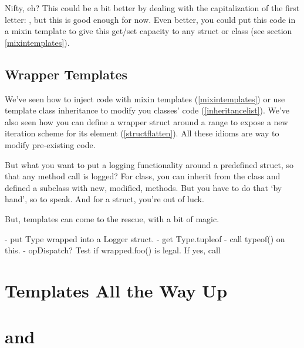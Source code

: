 Nifty, eh? This could be a bit better by dealing with the capitalization of the first letter: , but this is good enough for now. Even better, you could put this code in a mixin template to give this get/set capacity to any struct or class (see section \ref{mixintemplates}).

\subsection{Wrapper Templates}\label{wrappertemplates}


We've seen how to inject code with mixin templates (\ref{mixintemplates}) or use template class inheritance to modify you classes' code (\ref{inheritancelist}). We've also seen how you can define a wrapper struct around a range to expose a new iteration scheme for its element (\ref{structflatten}). All these idioms are way to modify pre-existing code. 

But what you want to put a logging functionality around a predefined struct, so that any method call is logged? For class, you can inherit from the class and defined a subclass with new, modified, methods. But you have to do that `by hand', so to speak. And for a struct, you're out of luck.

But, templates can come to the rescue, with a bit of  magic.


- put Type wrapped into a Logger struct.
- get Type.tupleof
- call typeof() on this.
- opDispatch? Test if wrapped.foo() is legal. If yes, call


\section{Templates All the Way Up}\label{templatesintemplates}


\section{ and }\label{fileandline}


